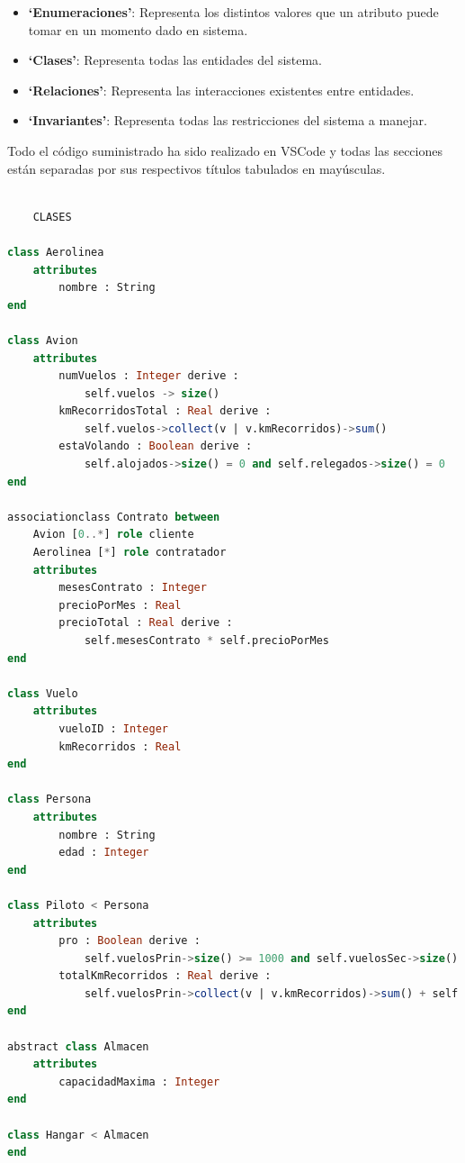 \documentclass[12pt.a4paper]{article}
\begin{document}
\begin{itemize}
    \item \textbf{‘Enumeraciones’}: Representa los distintos valores que un atributo puede tomar en un momento dado en sistema.
    \item \textbf{‘Clases’}: Representa todas las entidades del sistema.
    \item \textbf{‘Relaciones’}: Representa las interacciones existentes entre entidades.
    \item \textbf{‘Invariantes’}: Representa todas las restricciones del sistema a manejar.
\end{itemize}
Todo el código suministrado ha sido realizado en VSCode y
todas las secciones están separadas por sus respectivos títulos tabulados en mayúsculas.
\vspace{3cm}
\begin{lstlisting}[style = useNormal,language=SQL, caption={Modelo de Sistema de Aviación en USE}] 

    CLASES

class Aerolinea
    attributes
        nombre : String
end

class Avion
    attributes
        numVuelos : Integer derive :
            self.vuelos -> size()
        kmRecorridosTotal : Real derive : 
            self.vuelos->collect(v | v.kmRecorridos)->sum()
        estaVolando : Boolean derive :
            self.alojados->size() = 0 and self.relegados->size() = 0
end

associationclass Contrato between
    Avion [0..*] role cliente
    Aerolinea [*] role contratador
    attributes
        mesesContrato : Integer
        precioPorMes : Real
        precioTotal : Real derive :
            self.mesesContrato * self.precioPorMes
end

class Vuelo
    attributes
        vueloID : Integer
        kmRecorridos : Real
end

class Persona
    attributes
        nombre : String
        edad : Integer
end

class Piloto < Persona
    attributes
        pro : Boolean derive : 
            self.vuelosPrin->size() >= 1000 and self.vuelosSec->size() >= 2000
        totalKmRecorridos : Real derive : 
            self.vuelosPrin->collect(v | v.kmRecorridos)->sum() + self.vuelosSec->collect(v | v.kmRecorridos)->sum()
end

abstract class Almacen
    attributes
        capacidadMaxima : Integer
end

class Hangar < Almacen
end


\end{lstlisting}
\end{document}
